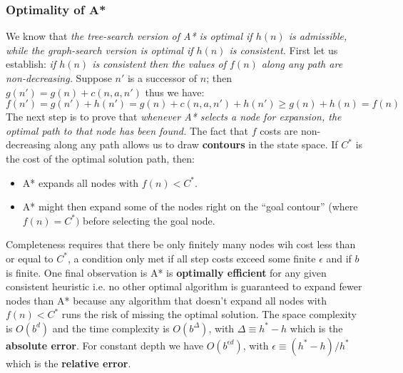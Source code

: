 \documentclass[twoside]{article}
\begin{document}
\subsubsection{Optimality of A*}
We know that \emph{the tree-search version of A* is optimal if \(h(n)\) is 
admissible, while the graph-search version is optimal if \(h(n)\) is consistent.}
First let us establish: \emph{if \(h(n)\) is consistent then the values of
\(f(n)\) along any path are non-decreasing.} Suppose \(n'\) is a successor of
\(n\); then \(g(n') = g(n) + c(n,a,n')\) thus we have:
\begin{equation}
        f(n') = g(n') + h(n') = g(n) + c(n,a,n') + h(n') \geq g(n) + h(n) = f(n)
\end{equation}
The next step is to prove that \emph{whenever A* selects a node for expansion,
the optimal path to that node has been found.} The fact that \(f\) costs are
non-decreasing along any path allows us to draw \textbf{contours} in the state
space. If \(C^*\) is the cost of the optimal solution path, then:
\begin{itemize}
        \item A* expands all nodes with \(f(n) < C^*\).
        \item A* might then expand some of the nodes right on the ``goal contour''
              (where \(f(n) = C^*)\) before selecting the goal node.
\end{itemize}
Completeness requires that there be only finitely many nodes wih cost less than
or equal to \(C^*\), a condition only met if all step costs exceed some finite
\(\epsilon\) and if \(b\) is finite. One final observation is A* is 
\textbf{optimally efficient} for any given consistent heuristic i.e. no other
optimal algorithm is guaranteed to expand fewer nodes than A* because any 
algorithm that doesn't expand all nodes with \(f(n) < C^*\) runs the risk of 
missing the optimal solution. The space complexity is \(O(b^d)\) and the 
time complexity is \(O(b^\Delta)\), with 
\(\Delta \equiv h^* - h\) which is the \textbf{absolute error}.
For constant depth we have \(O(b^{\epsilon d})\), with 
\(\epsilon \equiv (h^* - h)/h^*\) which is the \textbf{relative error}.
\end{document}
